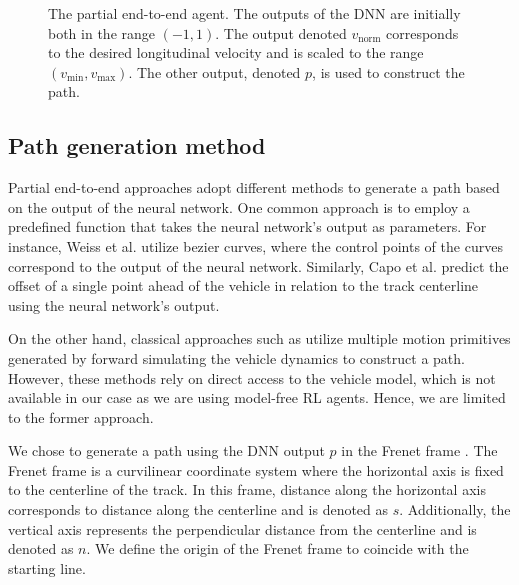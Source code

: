 \begin{figure}[htb!]
    \centering
    
    \caption[The partial end-to-end planner agent]{The partial end-to-end agent. The outputs of the DNN are initially both in the range $(-1,1)$. The output denoted $v_{\text{norm}}$ corresponds to the desired longitudinal velocity and is scaled to the range $(v_{\text{min}}, v_{\text{max}})$. The other output, denoted $p$, is used to construct the path.}
    \label{fig:steer_vel_agent}
\end{figure}


\subsection{Path generation method}\label{sec:path_construction}

Partial end-to-end approaches adopt different methods to generate a path based on the output of the neural network. 
One common approach is to employ a predefined function that takes the neural network's output as parameters. 
For instance, Weiss et al. \cite{Weiss2020a} utilize bezier curves, where the control points of the curves correspond to the output of the neural network. 
Similarly, Capo et al. \cite{Capo2020} predict the offset of a single point ahead of the vehicle in relation to the track centerline using the neural network's output.

On the other hand, classical approaches such as \cite{keefer2022, Liniger2015a, Wang2021} utilize multiple motion primitives generated by forward simulating the vehicle dynamics to construct a path. 
However, these methods rely on direct access to the vehicle model, which is not available in our case as we are using model-free RL agents.
Hence, we are limited to the former approach.


We chose to generate a path using the DNN output $p$ in the Frenet frame \cite{Stahl2019}.
The Frenet frame is a curvilinear coordinate system where the horizontal axis is fixed to the centerline of the track. 
In this frame, distance along the horizontal axis corresponds to distance along the centerline and is denoted as $s$. 
Additionally, the vertical axis represents the perpendicular distance from the centerline and is denoted as $n$.
We define the origin of the Frenet frame to coincide with the starting line.


